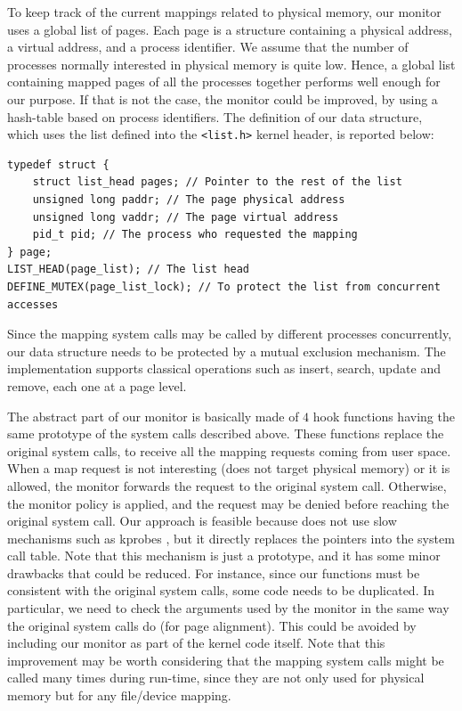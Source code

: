 To keep track of the current mappings related to physical memory, our monitor uses a global list of pages. Each page is a structure containing a physical address,
a virtual address, and a process identifier. We assume that the number of processes normally interested in physical memory is quite low.
Hence, a global list containing mapped pages of all the processes together performs well enough for our purpose.
If that is not the case, the monitor could be improved, \eg by using a hash-table based on process identifiers.
The definition of our data structure, which uses the list defined into the \verb|<list.h>| kernel header, is reported below:
\begin{lstlisting}
typedef struct {
	struct list_head pages; // Pointer to the rest of the list
	unsigned long paddr; // The page physical address
	unsigned long vaddr; // The page virtual address
	pid_t pid; // The process who requested the mapping
} page;
LIST_HEAD(page_list); // The list head
DEFINE_MUTEX(page_list_lock); // To protect the list from concurrent accesses
\end{lstlisting}
Since the mapping system calls may be called by different processes concurrently, our data structure needs to be protected by a mutual exclusion mechanism.
The implementation supports classical operations such as insert, search, update and remove, each one at a page level.

The abstract part of our monitor is basically made of $4$ hook functions having the same prototype of the system calls described above.
These functions replace the original system calls, to receive all the mapping requests coming from user space.
When a map request is not interesting (\eg does not target physical memory) or it is allowed, the monitor forwards the request to the original system call.
Otherwise, the monitor policy is applied, and the request may be denied before reaching the original system call.
Our approach is feasible because does not use slow mechanisms such as kprobes \cite{kprobes}, but it directly replaces the pointers into the system call table.
Note that this mechanism is just a prototype, and it has some minor drawbacks that could be reduced. For instance, since our functions must be consistent
with the original system calls, some code needs to be duplicated. In particular, we need to check the arguments used by the monitor in the same way the original system calls do
(\eg for page alignment). This could be avoided by including our monitor as part of the kernel code itself. Note that this improvement may be worth considering that
the mapping system calls might be called many times during run-time, since they are not only used for physical memory but for any file/device mapping.

